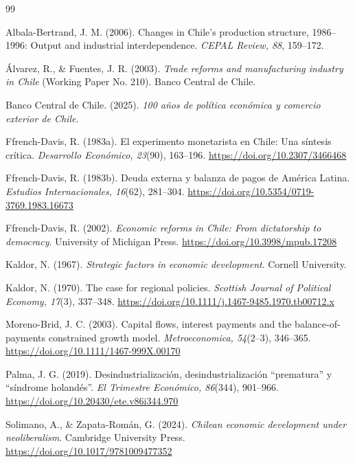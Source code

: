 \documentclass[11pt]{article}
\begin{document}
\FloatBarrier
\begin{thebibliography}{99}
\raggedright

Albala-Bertrand, J. M. (2006). Changes in Chile's production structure, 1986--1996: Output and industrial interdependence. \textit{CEPAL Review, 88}, 159--172.

Álvarez, R., \& Fuentes, J. R. (2003). \textit{Trade reforms and manufacturing industry in Chile} (Working Paper No. 210). Banco Central de Chile.

Banco Central de Chile. (2025). \textit{100 años de política económica y comercio exterior de Chile}.

Ffrench-Davis, R. (1983a). El experimento monetarista en Chile: Una síntesis crítica. \textit{Desarrollo Económico, 23}(90), 163--196. \url{https://doi.org/10.2307/3466468}

Ffrench-Davis, R. (1983b). Deuda externa y balanza de pagos de América Latina. \textit{Estudios Internacionales, 16}(62), 281--304. \url{https://doi.org/10.5354/0719-3769.1983.16673}

Ffrench-Davis, R. (2002). \textit{Economic reforms in Chile: From dictatorship to democracy}. University of Michigan Press. \url{https://doi.org/10.3998/mpub.17208}

Kaldor, N. (1967). \textit{Strategic factors in economic development}. Cornell University.

Kaldor, N. (1970). The case for regional policies. \textit{Scottish Journal of Political Economy, 17}(3), 337--348. \url{https://doi.org/10.1111/j.1467-9485.1970.tb00712.x}

Moreno-Brid, J. C. (2003). Capital flows, interest payments and the balance-of-payments constrained growth model. \textit{Metroeconomica, 54}(2--3), 346--365. \url{https://doi.org/10.1111/1467-999X.00170}

Palma, J. G. (2019). Desindustrialización, desindustrialización ``prematura'' y ``síndrome holandés''. \textit{El Trimestre Económico, 86}(344), 901--966. \url{https://doi.org/10.20430/ete.v86i344.970}

Solimano, A., \& Zapata-Román, G. (2024). \textit{Chilean economic development under neoliberalism}. Cambridge University Press. \url{https://doi.org/10.1017/9781009477352}


\end{thebibliography}
\end{document}

